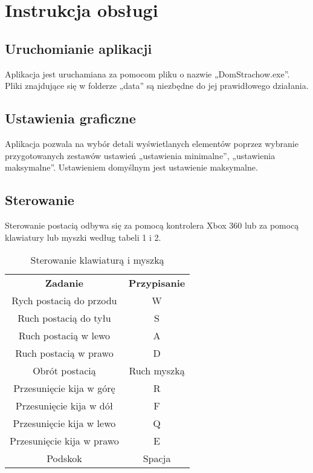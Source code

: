 \section{Instrukcja obsługi}

\subsection{Uruchomianie aplikacji}
Aplikacja jest uruchamiana za pomocom pliku o nazwie „DomStrachow.exe”.  Pliki znajdujące się w folderze „data” są niezbędne do jej prawidłowego działania.

\subsection{Ustawienia graficzne}
Aplikacja pozwala na wybór detali wyświetlanych elementów poprzez wybranie przygotowanych zestawów ustawień „ustawienia minimalne”, „ustawienia maksymalne”. Ustawieniem domyślnym jest ustawienie maksymalne.

\subsection{Sterowanie}
Sterowanie postacią odbywa się za pomocą kontrolera Xbox 360 lub za pomocą klawiatury lub myszki według tabeli 1 i 2.




\begin{table}[H]
	\begin{center}
	\begin{tabular}{|c | c|}
		\rowcolor{blue!50}    
		\multicolumn{2}{|c|}{Sterowanie klawiaturą i myszką}          %
	       \\ \hline
		\textbf{Zadanie} & \textbf{Przypisanie} \\
		Rych postacią do przodu & W \\
		Ruch postacią do tyłu & S\\
		Ruch postacią w lewo & A \\
		Ruch postacią w prawo & D  \\
		Obrót postacią & Ruch myszką  \\
		Przesunięcie kija w górę & R  \\
		Przesunięcie kija w dół & F  \\
		Przesunięcie kija w lewo & Q  \\
		Przesunięcie kija w prawo & E  \\
		Podskok & Spacja  \\ \hline
	\end{tabular}
	\end{center}
	\caption{Sterowanie klawiaturą i myszką}
	\label{ControlTable}
\end{table}


